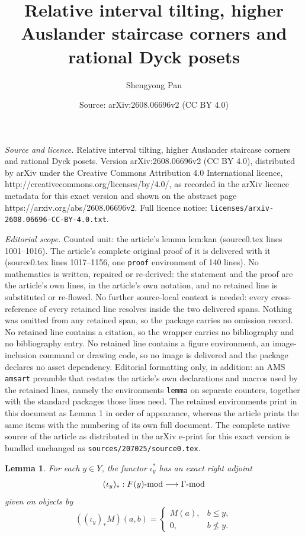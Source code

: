 \documentclass[10pt,a4paper]{amsart}
\title{Relative interval tilting, higher Auslander staircase corners and rational Dyck posets}
\author{Shengyong Pan}
\date{Source: arXiv:2608.06696v2 (CC BY 4.0)}
\newtheorem{lemma}{Lemma}
\newcommand{\G}{\Gamma}
\newcommand{\modcat}{\ensuremath{\mbox{\rm -mod}}}
\begin{document}
\maketitle

\noindent\emph{Source and licence.} Relative interval tilting, higher Auslander staircase corners and rational Dyck posets. Version arXiv:2608.06696v2 (CC BY 4.0), distributed by arXiv under the Creative Commons Attribution 4.0 International licence, http://creativecommons.org/licenses/by/4.0/, as recorded in the arXiv licence metadata for this exact version and shown on the abstract page https://arxiv.org/abs/2608.06696v2. Full licence notice: \texttt{licenses/arxiv-2608.06696-CC-BY-4.0.txt}.\par\smallskip

\noindent\textit{Editorial scope.} Counted unit: the article's lemma lem:kan (source0.tex lines 1001--1016). The article's complete original proof of it is delivered with it (source0.tex lines 1017--1156, one \texttt{proof} environment of 140 lines). No mathematics is written, repaired or re-derived: the statement and the proof are the article's own lines, in the article's own notation, and no retained line is substituted or re-flowed.  No further source-local context is needed: every cross-reference of every retained line resolves inside the two delivered spans.  Nothing was omitted from any retained span, so the package carries no omission record.  No retained line contains a citation, so the wrapper carries no bibliography and no bibliography entry.  No retained line contains a figure environment, an image-inclusion command or drawing code, so no image is delivered and the package declares no asset dependency.  Editorial formatting only, in addition: an AMS \texttt{amsart} preamble that restates the article's own declarations and macros used by the retained lines, namely the environments \texttt{lemma} on separate counters, together with the standard packages those lines need.  The retained environments print in this document as Lemma 1 in order of appearance, whereas the article prints the same items with the numbering of its own full document.  The complete native source of the article as distributed in the arXiv e-print for this exact version is bundled unchanged as \texttt{sources/207025/source0.tex}.
\begin{lemma}
\label{lem:kan}
For each $y\in Y$, the functor $\iota_y^*$ has an exact right adjoint
\[
 (\iota_y)_*: F(y)\modcat\longrightarrow\G\modcat
\]
given on objects by
\begin{equation}
 ((\iota_y)_*M)(a,b)=
 \begin{cases}
 M(a),&b\leq y,\\
 0,&b\nleq y.
 \end{cases}
\label{eq:kan-formula}
\end{equation}
\end{lemma}
\end{document}
